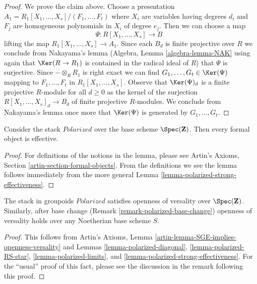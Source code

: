 \begin{proof}
\medskip\noindent
We prove the claim above.
Choose a presentation $A_1 = R_1[X_1, \ldots, X_s]/(F_1, \ldots, F_t)$
where $X_i$ are variables having degrees $d_i$ and $F_j$
are homogeneous polynomials in $X_i$ of degree $e_j$.
Then we can choose a map
$$
\Psi : R[X_1, \ldots, X_s] \longrightarrow B
$$
lifting the map $R_1[X_1, \ldots, X_s] \to A_1$. Since each $B_d$
is finite projective over $R$ we conclude from 
Nakayama's lemma (Algebra, Lemma \ref{algebra-lemma-NAK}
using again that $\Ker(R \to R_1)$ is contained in the radical
ideal of $R$) that $\Psi$ is surjective. Since $- \otimes_R R_1$ is right
exact we can find $G_1, \ldots, G_t \in \Ker(\Psi)$
mapping to $F_1, \ldots, F_t$ in $R_1[X_1, \ldots, X_s]$.
Observe that $\Ker(\Psi)_d$ is a finite projective $R$-module
for all $d \geq 0$ as the kernel of the surjection
$R[X_1, \ldots, X_s]_d \to B_d$ of finite projective $R$-modules.
We conclude from Nakayama's lemma once more that 
$\Ker(\Psi)$ is generated by $G_1, \ldots, G_t$.
\end{proof}

\begin{lemma}
\label{lemma-polarized-existence}
Consider the stack $\textit{Polarized}$ over the base
scheme $\Spec(\mathbf{Z})$. Then every formal object is effective.
\end{lemma}

\begin{proof}
For definitions of the notions in the lemma, please see
Artin's Axioms, Section \ref{artin-section-formal-objects}.
From the definitions we see the lemma follows immediately
from the more general Lemma \ref{lemma-polarized-strong-effectiveness}.
\end{proof}

\begin{lemma}
\label{lemma-polarized-defo-thy}
The stack in groupoids $\textit{Polarized}$
satisfies openness of versality over $\Spec(\mathbf{Z})$.
Similarly, after base change (Remark \ref{remark-polarized-base-change})
openness of versality holds over any Noetherian base scheme $S$.
\end{lemma}

\begin{proof}
This follows from
Artin's Axioms, Lemma \ref{artin-lemma-SGE-implies-openness-versality}
and Lemmas \ref{lemma-polarized-diagonal},
\ref{lemma-polarized-RS-star},
\ref{lemma-polarized-limits}, and
\ref{lemma-polarized-strong-effectiveness}.
For the ``usual'' proof of this fact, please see the discussion
in the remark following this proof.
\end{proof}

